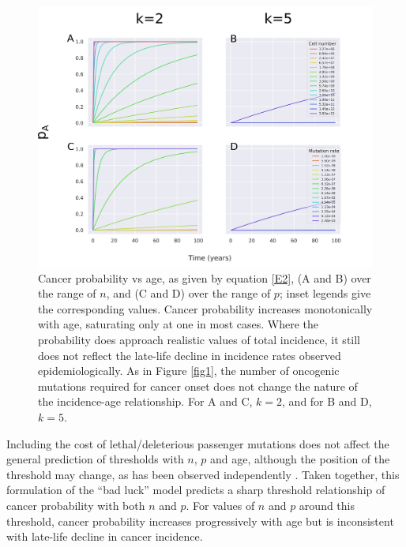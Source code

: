 \documentclass[9pt,onecolumn,twoside]{pnas-new}
\begin{document}
\begin{figure}[tbhp]
	\centering
	\includegraphics[width=\linewidth]{fig2.png}
	\caption{Cancer probability vs age, as given by equation \ref{E2}, (A and B) over the range of $n$, and (C and D) over the range of $p$; inset legends give the corresponding values. Cancer probability increases monotonically with age, saturating only at one in most cases. Where the probability does approach realistic values of total incidence, it still does not reflect the late-life decline in incidence rates observed epidemiologically. As in Figure \ref{fig1}, the number of oncogenic mutations required for cancer onset does not change the nature of the incidence-age relationship. For A and C, $k=2$, and for B and D, $k=5$.}
	\label{fig2}
\end{figure}

Including the cost of lethal/deleterious passenger mutations does not affect the general prediction of thresholds with $n$, $p$ and age, although the position of the threshold may change, as has been observed independently \cite{McFarland2013}. Taken together, this formulation of the ``bad luck'' model predicts a sharp threshold relationship of cancer probability with both $n$ and $p$. For values of $n$ and $p$ around this threshold, cancer probability increases progressively with age but is inconsistent with late-life decline in cancer incidence. 
\end{document}
